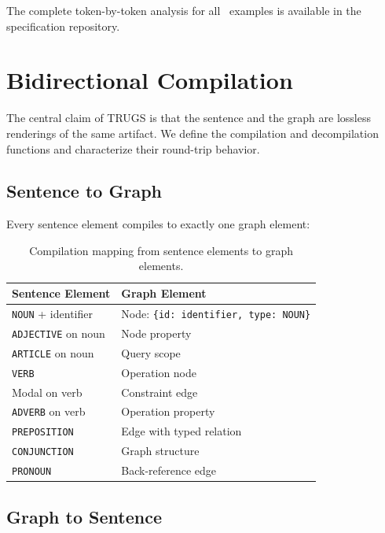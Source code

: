 \documentclass{article}
\begin{document}
The complete token-by-token analysis for all \ExamplesTotal\ examples is available in the specification repository.

\section{Bidirectional Compilation}

The central claim of TRUGS is that the sentence and the graph are lossless renderings of the same artifact. We define the compilation and decompilation functions and characterize their round-trip behavior.

\subsection{Sentence to Graph}

Every sentence element compiles to exactly one graph element:

\begin{table}[h]
\centering
\caption{Compilation mapping from sentence elements to graph elements.}
\label{tab:compile}
\begin{tabular}{ll}
\toprule
\textbf{Sentence Element} & \textbf{Graph Element} \\
\midrule
\texttt{NOUN} + identifier & Node: \texttt{\{id: identifier, type: NOUN\}} \\
\texttt{ADJECTIVE} on noun & Node property \\
\texttt{ARTICLE} on noun & Query scope \\
\texttt{VERB} & Operation node \\
Modal on verb & Constraint edge \\
\texttt{ADVERB} on verb & Operation property \\
\texttt{PREPOSITION} & Edge with typed relation \\
\texttt{CONJUNCTION} & Graph structure \\
\texttt{PRONOUN} & Back-reference edge \\
\bottomrule
\end{tabular}
\end{table}

\subsection{Graph to Sentence}
\end{document}
